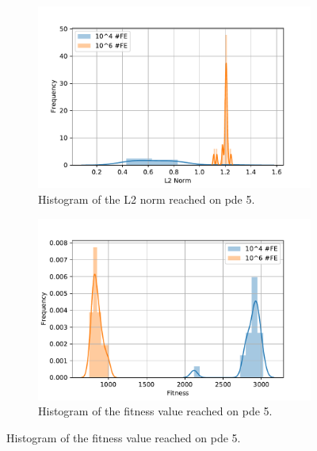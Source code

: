 \documentclass[./\jobname.tex]{subfiles}
\begin{document}
\begin{figure}[H]
	\centering
	\begin{subfigure}[b]{0.5\linewidth}
		\centering
		\includegraphics[width=1\textwidth]{../../code/experiments/experiment_0/pde5_norm_histogram.pdf}
		\caption{Histogram of the L2 norm reached on \gls{pde} 5.}
		\label{fig:pde5_norm_histogram}
	\end{subfigure}%
	\begin{subfigure}[b]{0.5\linewidth}
		\centering
		\includegraphics[width=1\textwidth]{../../code/experiments/experiment_0/pde5_fit_histogram.pdf}
		\caption{Histogram of the fitness value reached on \gls{pde} 5.}
		\label{fig:pde5_fitness_histogram}
	\end{subfigure}%
	\label{fig:pde5_histograms}
\end{figure}
\end{document}
